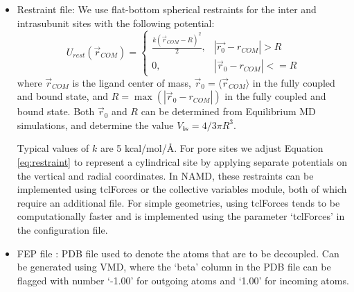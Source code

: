 \documentclass[12pt]{article}
\begin{document}
\begin{itemize}
\begin{itemize}
	\item Restraint file: 
	We use flat-bottom spherical restraints for the inter and intrasubunit sites with the following potential: 
	\begin{equation}
U_{rest}(\vec{r}_{COM}) = 	
\begin{cases} 
\frac{k (\vec{r}_{COM} - R)^2}{2} ,& \left |{\vec{r_{0}}}-r_{COM}\right |> R\\
0 ,&\left |{\vec{r}_{0}}-r_{COM}\right| <= R
\end{cases}\label{eq:restraint}
	\end{equation}
 where $\vec{r}_{COM}$ is the ligand center of mass, $\vec{r}_{0} = \langle \vec{r}_{COM} \rangle $ in the fully coupled and bound state, and $R = \max(\left|\vec{r}_{0}-r_{COM}\right |)$ in the fully coupled and bound state. Both $\vec{r}_{0}$  and $R$ can be determined from Equilibrium MD simulations, and determine the value $V_{bs} = 4/3 \pi R^{3}$. 
 
Typical values of $k$ are 5 kcal/mol/\AA.  For pore sites we adjust Equation \ref{eq:restraint} to represent a cylindrical site by applying separate potentials on the vertical and radial coordinates.   In NAMD, these restraints can be implemented using tclForces or the collective variables module, both of which require an additional file.  For simple geometries, using tclForces tends to be computationally faster and is implemented using the parameter `tclForces' in the configuration file.

	\item FEP file : PDB file used to denote the atoms that are to be decoupled. Can be generated using VMD, where the `beta' column in the PDB file can be flagged with number `-1.00' for outgoing atoms and `1.00' for incoming atoms. 
	\end{itemize}
\end{itemize}
\end{document}
